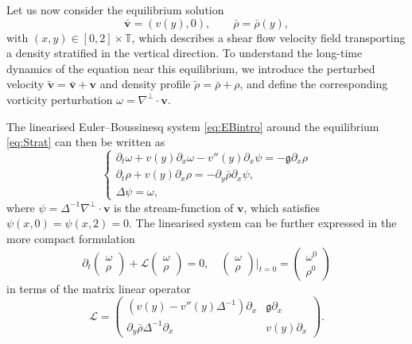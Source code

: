\documentclass[11pt,reqno]{amsproc}
\theoremstyle{definition}
\numberwithin{equation}{section}
\renewcommand{\L}{{\mathcal{L}}}
\newcommand{\D}{{\Delta}}
\newcommand{\T}{{\mathbb T}}
\renewcommand{\o}{{\omega}}
\renewcommand{\v}{\boldsymbol{v}}
\newcommand{\p}{\partial}
\renewcommand{\l}{\left}
\renewcommand{\r}{\right}
\begin{document}
Let us now consider the equilibrium solution 
\begin{equation}\label{eq:Strat}
\bar{\v}=(v(y),0), \qquad \bar{\rho}=\bar{\rho}(y), 
\end{equation}
with $(x,y)\in[0,2]\times\T$, which describes a shear flow velocity field transporting a density stratified in the vertical direction. To understand the long-time dynamics of the equation near this equilibrium, we introduce the perturbed velocity 
$\tilde{\v}=\bar{\v}+\v$ and density profile $\tilde{\rho}=\bar{\rho}+\rho$, and define the corresponding vorticity perturbation $\o=\nabla^\perp\cdot \v$. 

The linearised Euler--Boussinesq system \eqref{eq:EBintro}  around the equilibrium \eqref{eq:Strat} can then be written as
\begin{equation}\label{eq:linEulerBouss}
\begin{cases}
\partial_t\omega + v(y)\partial_x\omega-v''(y)\partial_x\psi=-\mathfrak{g}\partial_x\rho \\
\partial_t\rho + v(y)\partial_x\rho =-\partial_y\bar{\rho}\p_x\psi,\\
\D\psi=\omega,
\end{cases}
\end{equation}
where $\psi= \Delta^{-1}\nabla^\perp \cdot\v $ is the stream-function of $\v$, which satisfies $\psi(x,0)=\psi(x,2)=0$. The linearised system can be further expressed in the more compact formulation
\begin{equation}\label{eq:compactLinBoussinesq}
\partial_t \begin{pmatrix}
\omega \\ \rho
\end{pmatrix} + \L \begin{pmatrix}
\omega \\ \rho
\end{pmatrix} = 0, \quad \begin{pmatrix}
\omega \\ \rho
\end{pmatrix} \Big|_{t=0} = \begin{pmatrix}
\omega ^0\\ \rho^0
\end{pmatrix}
\end{equation}
in terms of the matrix linear operator
\begin{equation}\label{eq:LinSSC}
\L=\begin{pmatrix}
\l(v(y) - v''(y)\D^{-1}\r)\p_x & \mathfrak{g}\p_x \\
\p_y\bar{\rho}\D^{-1}\p_x & v(y)\p_x
\end{pmatrix}.
\end{equation}
\end{document}
